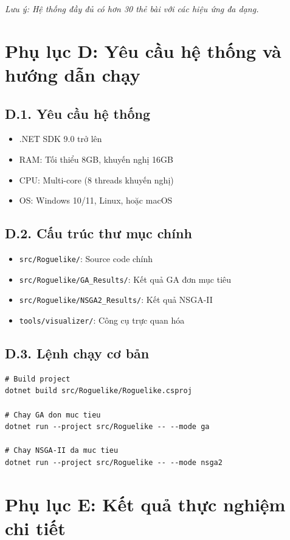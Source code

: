 \textit{Lưu ý: Hệ thống đầy đủ có hơn 30 thẻ bài với các hiệu ứng đa dạng.}

\section*{Phụ lục D: Yêu cầu hệ thống và hướng dẫn chạy}

\subsection*{D.1. Yêu cầu hệ thống}
\begin{itemize}
    \item .NET SDK 9.0 trở lên
    \item RAM: Tối thiểu 8GB, khuyến nghị 16GB  
    \item CPU: Multi-core (8 threads khuyến nghị)
    \item OS: Windows 10/11, Linux, hoặc macOS
\end{itemize}

\subsection*{D.2. Cấu trúc thư mục chính}
\begin{itemize}
    \item \texttt{src/Roguelike/}: Source code chính
    \item \texttt{src/Roguelike/GA\_Results/}: Kết quả GA đơn mục tiêu
    \item \texttt{src/Roguelike/NSGA2\_Results/}: Kết quả NSGA-II
    \item \texttt{tools/visualizer/}: Công cụ trực quan hóa
\end{itemize}

\subsection*{D.3. Lệnh chạy cơ bản}
\begin{verbatim}
# Build project
dotnet build src/Roguelike/Roguelike.csproj

# Chay GA don muc tieu
dotnet run --project src/Roguelike -- --mode ga

# Chay NSGA-II da muc tieu  
dotnet run --project src/Roguelike -- --mode nsga2
\end{verbatim}

\section*{Phụ lục E: Kết quả thực nghiệm chi tiết}

